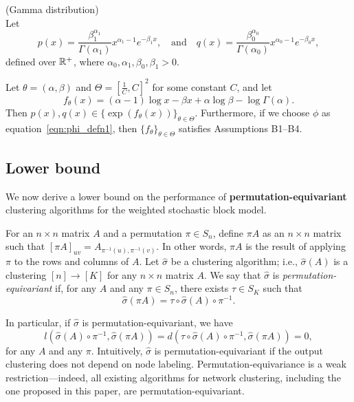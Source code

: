 \documentclass{article}
\begin{document}
\begin{example} (Gamma distribution)\\
Let
\[
p(x) = \frac{\beta_1^{\alpha_1}}{\Gamma(\alpha_1)} x^{\alpha_1 - 1} e^{- \beta_1 x}, \quad \text{and} \quad
q(x) = \frac{\beta_0^{\alpha_0}}{\Gamma(\alpha_0)} x^{\alpha_0 - 1} e^{- \beta_0 x},
\]
defined over ${\mathbb R}^+$, where $\alpha_0, \alpha_1, \beta_0, \beta_1 > 0$.

Let $\theta = (\alpha, \beta)$ and $\Theta = [\frac{1}{C}, C]^2$ for some constant $C$, and let
$$
f_{\theta}(x) = (\alpha - 1) \log x - \beta x + \alpha \log \beta - \log \Gamma(\alpha).
$$
Then $p(x), q(x) \in \{ \exp(f_\theta(x)) \}_{\theta \in \Theta}
$. Furthermore, if we choose $\phi$ as equation~\eqref{eqn:phi_defn1}, then $\{ f_\theta \}_{\theta \in \Theta}$ satisfies Assumptions B1--B4.

\end{example}


\subsection{Lower bound}

We now derive a lower bound on the performance of \textbf{permutation-equivariant} clustering algorithms for the weighted stochastic block model. 

\begin{definition}
For an $n \times n$ matrix $A$ and a permutation $\pi \in S_n$, define $\pi A$ as an $n \times n$ matrix such that $[\pi A]_{uv} = A_{\pi^{-1}(u), \pi^{-1}(v)}$. In other words, $\pi A$ is the result of applying $\pi$ to the rows and columns of $A$. Let $\hat{\sigma}$ be a clustering algorithm; i.e., $\hat{\sigma}(A)$ is a clustering $[n] \rightarrow [K]$ for any $n \times n$ matrix $A$. We say that $\hat{\sigma}$ is \emph{permutation-equivariant} if, for any $A$ and any $\pi \in S_n$, there exists $\tau \in S_K$ such that $$ \hat{\sigma}(\pi A) = \tau \circ \hat{\sigma}(A) \circ \pi^{-1}.$$
\end{definition}

In particular, if $\hat{\sigma}$ is permutation-equivariant, we have
$$l(\hat{\sigma}(A) \circ \pi^{-1}, \hat{\sigma}(\pi A)) = d(\tau \circ \hat{\sigma}(A) \circ \pi^{-1}, \hat{\sigma}(\pi A)) = 0,$$ 
for any $A$ and any $\pi$. Intuitively, $\hat{\sigma}$ is permutation-equivariant if the output clustering does not depend on node labeling.
Permutation-equivariance is a weak restriction---indeed, all existing algorithms for network clustering, including the one proposed in this paper, are permutation-equivariant. 
\end{document}
